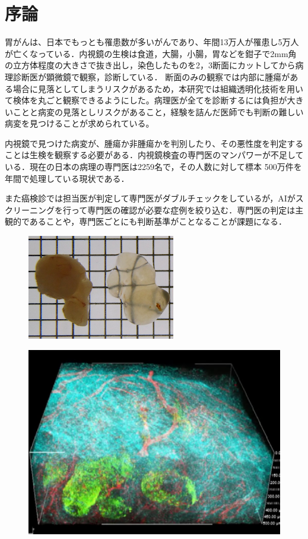 \chapter{序論}
\label{chap_intro}
胃がんは、日本でもっとも罹患数が多いがんであり、年間13万人が罹患し5万人が亡くなっている．内視鏡の生検は食道，大腸，小腸，胃などを鉗子で2mm角の立方体程度の大きさで抜き出し，染色したものを2，3断面にカットしてから病理診断医が顕微鏡で観察，診断している．
断面のみの観察では内部に腫瘍がある場合に見落としてしまうリスクがあるため，本研究では組織透明化技術を用いて検体を丸ごと観察できるようにした。病理医が全てを診断するには負担が大きいことと病変の見落としリスクがあること，経験を詰んだ医師でも判断の難しい病変を見つけることが求められている。

内視鏡で見つけた病変が、腫瘍か非腫瘍かを判別したり、その悪性度を判定することは生検を観察する必要がある．内視鏡検査の専門医のマンパワーが不足している．現在の日本の病理の専門医は2259名で，その人数に対して標本 500万件を年間で処理している現状である．

また癌検診では担当医が判定して専門医がダブルチェックをしているが，AIがスクリーニングを行って専門医の確認が必要な症例を絞り込む．専門医の判定は主観的であることや，専門医ごとにも判断基準がことなることが課題になる．

\begin{figure}
	\centering
	\includegraphics[width=0.7\linewidth]{fig/chapter1/lucid}
	\caption[transparent specimen]{}
	\label{fig:lucid}
\end{figure}

\begin{figure}
	\centering
	\includegraphics[width=0.7\linewidth]{fig/chapter1/microscope}
	\caption[microscope]{}
	\label{fig:microscope}
\end{figure}



